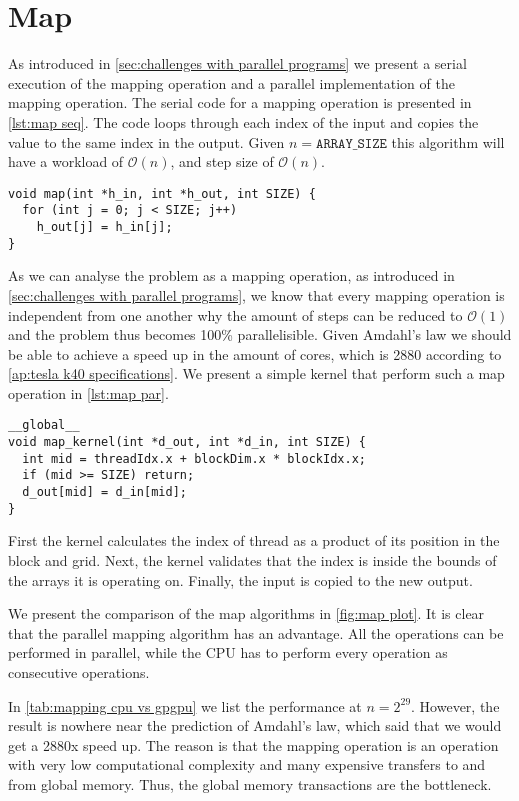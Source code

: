\section{Map}
\label{sec:map}

As introduced in \cref{sec:challenges with parallel programs} we present a serial execution of the mapping operation and a parallel implementation of the mapping operation.
The serial code for a mapping operation is presented in \cref{lst:map seq}.
The code loops through each index of the input and copies the value to the same index in the output.
Given $n=\mathtt{ARRAY\_SIZE}$ this algorithm will have a workload of $\mathcal{O}(n)$, and step size of $\mathcal{O}(n)$.

\begin{lstlisting}[caption={Serial map}, label={lst:map seq}]
void map(int *h_in, int *h_out, int SIZE) {
  for (int j = 0; j < SIZE; j++) 
    h_out[j] = h_in[j];
}
\end{lstlisting}

As we can analyse the problem as a mapping operation, as introduced in \cref{sec:challenges with parallel programs}, we know that every mapping operation is independent from one another why the amount of steps can be reduced to $\mathcal{O}(1)$ and the problem thus becomes 100\% parallelisible.
Given Amdahl's law we should be able to achieve a speed up in the amount of cores, which is 2880 according to \cref{ap:tesla k40 specifications}.
We present a simple kernel that perform such a map operation in \cref{lst:map par}.

\begin{lstlisting}[caption={Map kernel}, label={lst:map par}]
__global__ 
void map_kernel(int *d_out, int *d_in, int SIZE) {
  int mid = threadIdx.x + blockDim.x * blockIdx.x;
  if (mid >= SIZE) return;
  d_out[mid] = d_in[mid];
}
\end{lstlisting}

First the kernel calculates the index of thread as a product of its position in the block and grid.
Next, the kernel validates that the index is inside the bounds of the arrays it is operating on.
Finally, the input is copied to the new output.

We present the comparison of the map algorithms in \cref{fig:map plot}.
It is clear that the parallel mapping algorithm has an advantage.
All the operations can be performed in parallel, while the CPU has to perform every operation as consecutive operations.

In \cref{tab:mapping cpu vs gpgpu} we list the performance at $n = 2^{29}$.
However, the result is nowhere near the prediction of Amdahl's law, which said that we would get a 2880x speed up.
The reason is that the mapping operation is an operation with very low computational complexity and many expensive transfers to and from global memory.
Thus, the global memory transactions are the bottleneck.

